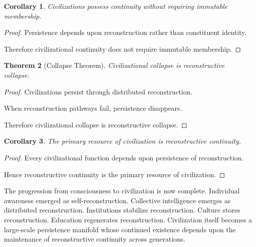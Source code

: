\documentclass[12pt,oneside]{article}
\newtheorem{theorem}{Theorem}[section] \newtheorem{lemma}[theorem]{Lemma} \newtheorem{proposition}[theorem]{Proposition} \newtheorem{corollary}[theorem]{Corollary}
\theoremstyle{definition}
\begin{document}
\begin{corollary}

Civilizations possess continuity without requiring immutable membership.

\end{corollary}

\begin{proof}

Persistence depends upon reconstruction rather than constituent identity.

Therefore civilizational continuity does not require immutable membership.

\end{proof}

\begin{theorem}[Collapse Theorem]

Civilizational collapse is reconstructive collapse.

\end{theorem}

\begin{proof}

Civilizations persist through distributed reconstruction.

When reconstruction pathways fail, persistence disappears.

Therefore civilizational collapse is reconstructive collapse.

\end{proof}

\begin{corollary}

The primary resource of civilization is reconstructive continuity.

\end{corollary}

\begin{proof}

Every civilizational function depends upon persistence of reconstruction.

Hence reconstructive continuity is the primary resource of civilization.

\end{proof}

The progression from consciousness to civilization is now complete. Individual awareness emerged as self-reconstruction. Collective intelligence emerges as distributed reconstruction. Institutions stabilize reconstruction. Culture stores reconstruction. Education regenerates reconstruction. Civilization itself becomes a large-scale persistence manifold whose continued existence depends upon the maintenance of reconstructive continuity across generations.
\end{document}
